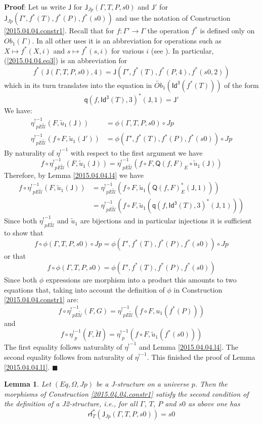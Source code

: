 \documentclass[12pt]{article}
\numberwithin{equation}{section}
\newenvironment{myproof}{{\bf Proof}:}{$\blacksquare$ \vskip 5mm }
\newtheorem{lemma}[proposition]{Lemma}
\newcommand{\llabel}[1]{\label{#1}}
\newcommand{\sr}{\rightarrow}
\newcommand{\wt}{\widetilde}
\newcommand{\q}{\mathsf{q}}
\newcommand{\Idx}{\mathsf{Id^3}} %
\newcommand{\J}{\mathsf{J}}
\newcommand{\U}{\mathcal{U}}
\newcommand{\rf}{\mathsf{rf}}
\newcommand{\Q}{\mathsf{Q}}
\newcommand{\etashriek}{\eta^!}
\newcommand{\etaunshriek}{{\etashriek}^{-1}}
\begin{document}
\begin{myproof}
Let us write $\J$ for $\J_{Jp}(\Gamma,T,P,s0)$ and $\J'$ for
$\J_{Jp}(\Gamma',f^*(T),f^*(P),f^*(s0))$ and use the notation of Construction
\ref{2015.04.04.constr1}. Recall that for $f:\Gamma'\sr \Gamma$ the operation
$f^*$ is defined only on $Ob_1(\Gamma)$. In all other uses it is an
abbreviation for operations such as $X\mapsto f^*(X,i)$ and $s\mapsto f^*(s,i)$
for various $i$ (see \cite{Csubsystems}). In particular, (\ref{2015.04.04.eq3})
is an abbreviation for
%
$$f^*(\J(\Gamma,T,P,s0),4)=\J(\Gamma',f^*(T),f^*(P,4),f^*(s0,2))$$
%
which in its turn translates into the equation in $\wt{Ob}_1(\Idx(f^*(T)))$ of
the form
%
$$\q(f,\Idx(T),3)^*(\J,1)=\J'$$
%
We have:
%
\begin{align*}
  \etaunshriek_{pE\wt{\U}}(F,\wt{u}_1(\J))&=\phi(\Gamma,T,P,s0)\circ Jp \\
  \etaunshriek_{pE\wt{\U}}(f\circ F, \wt{u}_1(\J'))&=\phi(\Gamma',f^*(T),f^*(P),f^*(s0))\circ Jp
\end{align*}
%
By naturality of $\etaunshriek$ with respect to the first argument we have
%
$$f\circ \etaunshriek_{pE\wt{\U}}(F,\wt{u}_1(\J))=\etaunshriek_{pE\wt{\U}}(f\circ F,
\Q(f,F)_{E}\circ \wt{u}_1(\J))$$
%
Therefore, by Lemma \ref{2015.04.04.l4} we have
%
\begin{align*}
  f\circ \etaunshriek_{pE\wt{\U}}(F,\wt{u}_1(\J))
    & = \etaunshriek_{pE\wt{\U}}(f\circ F, \wt{u}_1(\Q(f,F)_{E}^*(\J,1))) \\
    & = \etaunshriek_{pE\wt{\U}}(f\circ F, \wt{u}_1(\q(f,\Idx(T),3)^*(\J,1)))
\end{align*}
%
Since both $\etaunshriek_{pE\wt{\U}}$ and $\wt{u}_1$ are bijections and in particular
injections it is sufficient to show that
%
$$f\circ \phi(\Gamma,T,P,s0)\circ Jp = \phi(\Gamma',f^*(T),f^*(P),f^*(s0))\circ
Jp$$
%
or that
%
$$f\circ \phi(\Gamma,T,P,s0)=\phi(\Gamma',f^*(T),f^*(P),f^*(s0))$$
%
Since both $\phi$ expressions are morphism into a product this amounts to two
equations that, taking into account the definition of $\phi$ in Construction
\ref{2015.04.04.constr1} are:
%
$$f\circ \etaunshriek_{pE\wt{\U}}(F,G)=\etaunshriek_{pE\wt{\U}}(f\circ F, u_1(f^*(P)))$$
%
and
%
$$f\circ \etaunshriek_p(F,\wt{H})=\etaunshriek_p(f\circ F, \wt{u}_1(f^*(s0)))$$
%
The first equality follows naturality of $\etaunshriek$ and Lemma
\ref{2015.04.04.l4}. The second equality follows from naturality of
$\etaunshriek$. This finished the proof of Lemma \ref{2015.04.04.l1}.
\end{myproof}
%
\begin{lemma}
\llabel{2015.04.04.l5} Let $(Eq,\Omega,Jp)$ be a J-structure on a universe
$p$. Then the morphisms of Construction \ref{2015.04.04.constr1} satisfy the
second condition of the definition of a J2-structure, i.e., for all $\Gamma$,
$T$, $P$ and $s0$ as above one has
%
$$\rf_T^*(\J_{Jp}(\Gamma,T,P,s0))=s0$$
%
\end{lemma}
\end{document}
